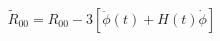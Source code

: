 \begin{equation} \tilde
	R_{00}= R_{00} -3\left[\ddot \phi(t) + H(t)\dot\phi\right]
	\end{equation} 
